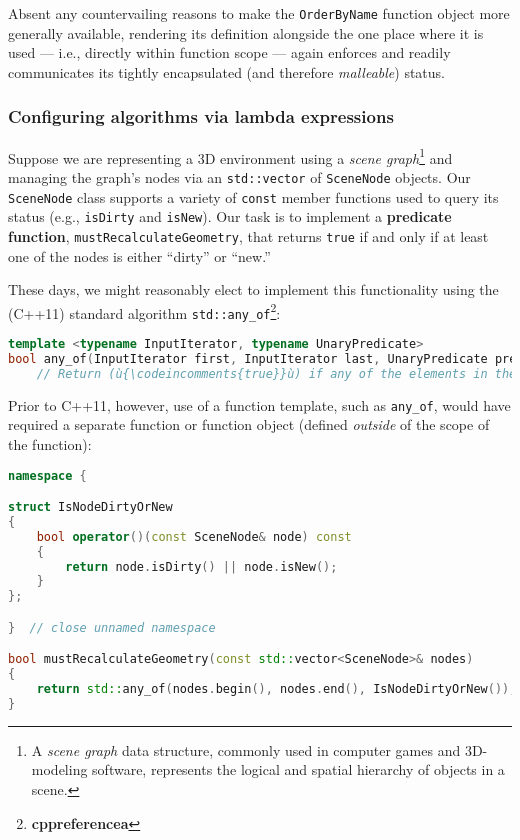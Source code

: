 \noindent Absent any countervailing reasons to make the \texttt{OrderByName}
function object more generally available, rendering its definition
alongside the one place where it is used --- i.e., directly within
function scope --- again enforces and readily communicates its tightly
encapsulated (and therefore \emph{malleable}) status.

\subsubsection[Configuring algorithms via lambda expressions]{Configuring algorithms via lambda expressions}\label{configuring-algorithms-via-lambda-expressions}

Suppose we are representing a 3D environment using a \emph{scene
graph}{\cprotect\footnote{A \emph{scene graph} data structure, commonly
used in computer games and 3D-modeling software, represents the
  logical and spatial hierarchy of objects in a scene.}} and managing
the graph's nodes via an \texttt{std::vector} of \texttt{SceneNode}
objects. Our \texttt{SceneNode} class supports a variety of
\texttt{const} member functions used to query its status (e.g.,
\texttt{isDirty} and \texttt{isNew}). Our task is to implement a
\textbf{predicate function}, \texttt{mustRecalculateGeometry}, that
returns \texttt{true} if and only if at least one of the nodes is either
``dirty'' or ``new.''

These days, we might reasonably elect to implement this functionality
using the (C++11) standard algorithm
\texttt{std::any\_of}{\cprotect\footnote{\textbf{cppreferencea}}}:

\begin{lstlisting}[language=C++]
template <typename InputIterator, typename UnaryPredicate>
bool any_of(InputIterator first, InputIterator last, UnaryPredicate pred);
    // Return (ù{\codeincomments{true}}ù) if any of the elements in the range satisfies (ù{\codeincomments{pred}}ù).
\end{lstlisting}

\noindent Prior to C++11, however, use of a function template, such as
\texttt{any\_of}, would have required a separate function or
function object (defined \emph{outside} of the scope of the function):

\begin{lstlisting}[language=C++]
namespace {

struct IsNodeDirtyOrNew
{
    bool operator()(const SceneNode& node) const
    {
        return node.isDirty() || node.isNew();
    }
};

}  // close unnamed namespace

bool mustRecalculateGeometry(const std::vector<SceneNode>& nodes)
{
    return std::any_of(nodes.begin(), nodes.end(), IsNodeDirtyOrNew());
}
\end{lstlisting}

